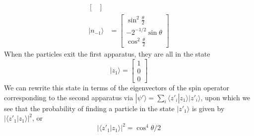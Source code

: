 \documentclass[../principles-of-quantum-mechanics.tex]{subfiles}
\begin{document}
\begin{questions}
\begin{solution}
\begin{align*}
\begin{bmatrix}
			\end{bmatrix} \\
			|n_{-1}\rangle &= \begin{bmatrix}
				\sin^2\tfrac{\theta}{2} \\
				-2^{-1/2}\sin\theta \\
				\cos^2\tfrac{\theta}{2}
			\end{bmatrix}
		\end{align*}
		When the particles exit the first apparatus, they are all in the state $$|z_1\rangle = \begin{bmatrix}1 \\ 0 \\ 0 \end{bmatrix}$$
		We can rewrite this state in terms of the eigenvectors of the spin operator corresponding to the second apparatus via $|\psi'\rangle = \sum_i\langle z'_i|z_1\rangle|z'_i\rangle$, upon which we see that the probability of finding a particle in the state $|z'_1\rangle$ is given by $|\langle z'_1|z_1\rangle|^2$, or
		$$|\langle z'_1|z_1\rangle|^2 = \cos^4\theta/2$$
	\end{solution}
	\end{questions}
\end{document}
